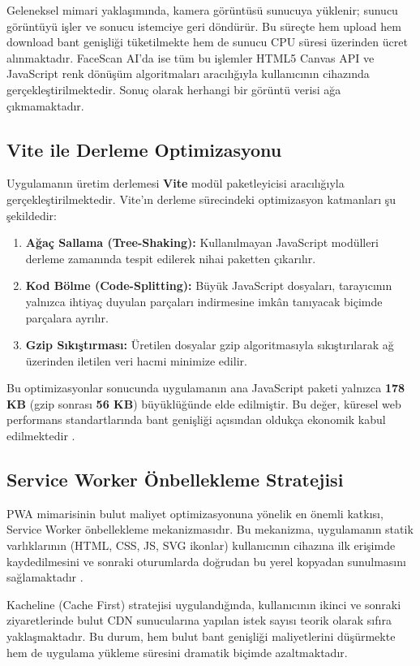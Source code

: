 Geleneksel mimari yaklaşımında, kamera görüntüsü sunucuya yüklenir; sunucu görüntüyü işler ve sonucu istemciye geri döndürür. Bu süreçte hem upload hem download bant genişliği tüketilmekte hem de sunucu CPU süresi üzerinden ücret alınmaktadır. FaceScan AI'da ise tüm bu işlemler HTML5 Canvas API ve JavaScript renk dönüşüm algoritmaları aracılığıyla kullanıcının cihazında gerçekleştirilmektedir. Sonuç olarak herhangi bir görüntü verisi ağa çıkmamaktadır.

\subsection{Vite ile Derleme Optimizasyonu}

Uygulamanın üretim derlemesi \textbf{Vite} modül paketleyicisi aracılığıyla gerçekleştirilmektedir. Vite'ın derleme sürecindeki optimizasyon katmanları şu şekildedir:

\begin{enumerate}
  \item \textbf{Ağaç Sallama (Tree-Shaking):} Kullanılmayan JavaScript modülleri derleme zamanında tespit edilerek nihai paketten çıkarılır.
  \item \textbf{Kod Bölme (Code-Splitting):} Büyük JavaScript dosyaları, tarayıcının yalnızca ihtiyaç duyulan parçaları indirmesine imkân tanıyacak biçimde parçalara ayrılır.
  \item \textbf{Gzip Sıkıştırması:} Üretilen dosyalar gzip algoritmasıyla sıkıştırılarak ağ üzerinden iletilen veri hacmi minimize edilir.
\end{enumerate}

Bu optimizasyonlar sonucunda uygulamanın ana JavaScript paketi yalnızca \textbf{178 KB} (gzip sonrası \textbf{56 KB}) büyüklüğünde elde edilmiştir. Bu değer, küresel web performans standartlarında bant genişliği açısından oldukça ekonomik kabul edilmektedir \cite{panda2018cdn}.

\subsection{Service Worker Önbellekleme Stratejisi}

PWA mimarisinin bulut maliyet optimizasyonuna yönelik en önemli katkısı, Service Worker önbellekleme mekanizmasıdır. Bu mekanizma, uygulamanın statik varlıklarının (HTML, CSS, JS, SVG ikonlar) kullanıcının cihazına ilk erişimde kaydedilmesini ve sonraki oturumlarda doğrudan bu yerel kopyadan sunulmasını sağlamaktadır \cite{biorn2017progressive}.

Kacheline (Cache First) stratejisi uygulandığında, kullanıcının ikinci ve sonraki ziyaretlerinde bulut CDN sunucularına yapılan istek sayısı teorik olarak sıfıra yaklaşmaktadır. Bu durum, hem bulut bant genişliği maliyetlerini düşürmekte hem de uygulama yükleme süresini dramatik biçimde azaltmaktadır.
